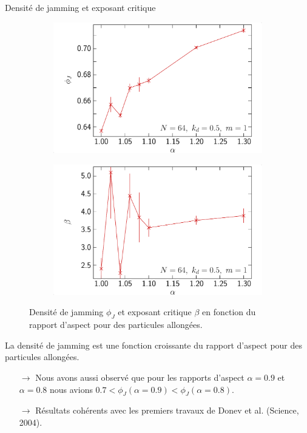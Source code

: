 \documentclass{beamer}
\begin{document}
\begin{frame}{Densité de jamming et exposant critique}
\vspace{-10pt}
\begin{figure}[h!]
\centering
    \begin{subfigure}[t]{0.49\textwidth}
        \centering
        \includegraphics[width=\textwidth]{figures/figs/phij_alpha_0064_KDk500_Ml100}
    \end{subfigure}
    \hfill
    \begin{subfigure}[t]{0.49\textwidth}
        \centering
        \includegraphics[width=\textwidth]{figures/figs/beta_alpha_0064_KDk500_Ml100}
    \end{subfigure}
    \caption{Densité de jamming $\phi_J$ et exposant critique $\beta$ en fonction du rapport d'aspect pour des particules allongées.}
\end{figure}
\vspace{-10pt}
La densité de jamming est une fonction croissante du rapport d’aspect pour des particules allongées.
\begin{itemize}
    \item[$\rightarrow$] Nous avons aussi observé que pour les rapports d’aspect $\alpha=0.9$ et $\alpha=0.8$ nous avions $0.7 < \phi_J(\alpha=0.9) < \phi_J(\alpha=0.8)$.
    \item[$\rightarrow$] Résultats cohérents avec les premiers travaux de Donev et al. (Science, 2004).
\end{itemize}

\end{frame}
\end{document}
